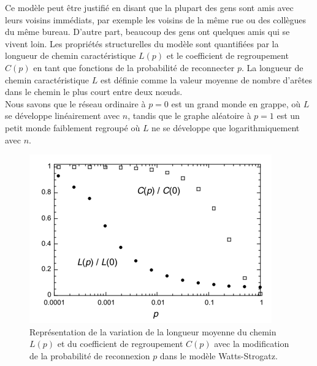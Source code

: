  Ce modèle peut être justifié en disant que la plupart des gens sont amis avec leurs voisins immédiats,  par exemple les voisins de la même rue ou des collègues du même bureau. D'autre part, beaucoup des gens ont quelques amis qui se vivent loin. Les propriétés structurelles du modèle sont quantifiées par la longueur de chemin caractéristique $L(p)$ et le coefficient de regroupement $C(p)$ en tant que fonctions de la probabilité de reconnecter $p$. La longueur de chemin caractéristique $L$ est définie comme la valeur moyenne de nombre d'arêtes dans le chemin le plus court entre deux nœuds.\\
 Nous savons que le réseau ordinaire à $p=0$ est un grand monde en grappe, où $L$ se développe linéairement avec $n$, tandis que le graphe aléatoire à $p=1$ est un petit monde faiblement regroupé où $L$ ne se développe que logarithmiquement avec $n$. 
 \begin{figure}[h!]
 	\centering
 	\includegraphics[scale=0.75]{./figures/SW2}
 	\caption{Représentation de la variation de la longueur moyenne du chemin $L(p)$ et du coefficient de regroupement $C(p)$ avec la modification de la probabilité de reconnexion $p$ dans le modèle Watts-Strogatz.}  	
 	\label{SW2}
 \end{figure}
 

